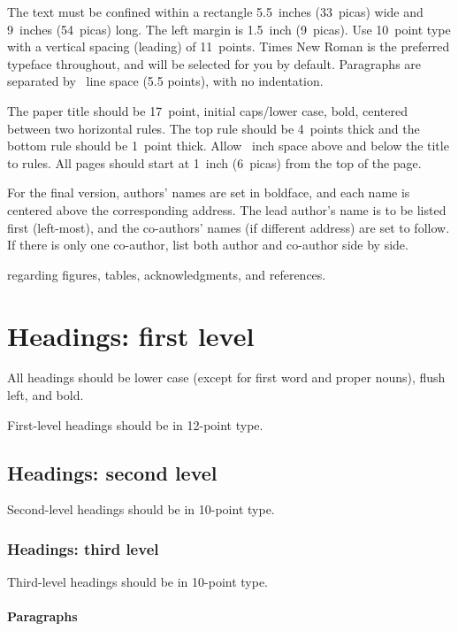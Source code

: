 \documentclass{article}
\begin{document}
The text must be confined within a rectangle 5.5~inches (33~picas) wide and
9~inches (54~picas) long. The left margin is 1.5~inch (9~picas).  Use 10~point
type with a vertical spacing (leading) of 11~points.  Times New Roman is the
preferred typeface throughout, and will be selected for you by default.
Paragraphs are separated by ~line space (5.5 points), with no
indentation.

The paper title should be 17~point, initial caps/lower case, bold, centered
between two horizontal rules. The top rule should be 4~points thick and the
bottom rule should be 1~point thick. Allow ~inch space above and
below the title to rules. All pages should start at 1~inch (6~picas) from the
top of the page.

For the final version, authors' names are set in boldface, and each name is
centered above the corresponding address. The lead author's name is to be listed
first (left-most), and the co-authors' names (if different address) are set to
follow. If there is only one co-author, list both author and co-author side by
side.

regarding figures, tables, acknowledgments, and references.

\section{Headings: first level}
\label{headings}

All headings should be lower case (except for first word and proper nouns),
flush left, and bold.

First-level headings should be in 12-point type.

\subsection{Headings: second level}

Second-level headings should be in 10-point type.

\subsubsection{Headings: third level}

Third-level headings should be in 10-point type.

\paragraph{Paragraphs}
\end{document}
